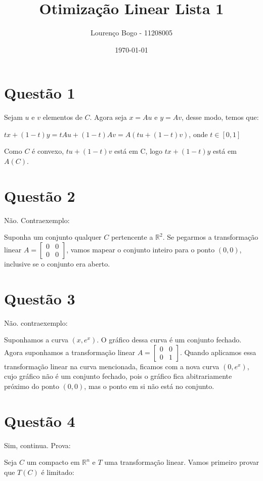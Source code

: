 \documentclass[11pt]{article}
\author{Lourenço Bogo - 11208005}
\date{\today}
\title{Otimização Linear Lista 1}
\begin{document}
\maketitle


\section{Questão 1}
\label{sec:org7ad73b5}
Sejam \(u\) e \(v\) elementos de \(C\). Agora seja \(x = Au\) e
\(y = Av\), desse modo, temos que:

\(tx+(1-t)y = tAu + (1-t)Av = A(tu+(1-t)v)\), onde \(t \in [0, 1]\)

Como \(C\) é convexo, \(tu+(1-t)v\) está em C, logo \(tx+(1-t)y\)
está em \(A(C)\).
\section{Questão 2}
\label{sec:org19b66fe}
Não. Contraexemplo:

Suponha um conjunto qualquer \(C\) pertencente a
\(\mathbb{R}^2\). Se pegarmos a transformação linear
\(A =
  \begin{bmatrix}
  0 & 0 \\
  0 & 0
  \end{bmatrix}\), vamos mapear o conjunto inteiro para o
ponto \((0, 0)\), inclusive se o conjunto era aberto.
\section{Questão 3}
\label{sec:orgb93acd6}
Não. contraexemplo:

Suponhamos a curva \((x, e^x)\). O gráfico dessa curva é um
conjunto fechado. Agora suponhamos a transformação linear
\(A =
  \begin{bmatrix}
  0 & 0 \\
  0 & 1
  \end{bmatrix}\). Quando aplicamos essa transformação linear
na curva mencionada, ficamos com a nova curva \((0, e^x)\),
cujo gráfico não é um conjunto fechado, pois o gráfico fica
abitrariamente próximo do ponto \((0, 0)\), mas o ponto em si
não está no conjunto.
\section{Questão 4}
\label{sec:orgf1d4008}
Sim, continua. Prova:

Seja \(C\) um compacto em \(\mathbb{R}^n\) e \(T\) uma transformação linear. Vamos primeiro provar que
\(T(C)\) é limitado:
\end{document}
